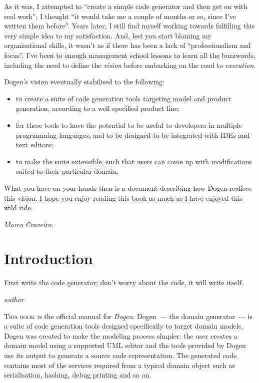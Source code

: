 \documentclass{book}
\begin{document}
As it was, I attempted to ``create a simple code generator and then
get on with real work''; I thought ``it would take me a couple of
months or so, since I've written them before''. Years later, I still
find myself working towards fulfilling this very simple idea to my
satisfaction. And, lest you start blaming my organisational skills, it
wasn't as if there has been a lack of ``professionalism and
focus''. I've been to enough management school lessons to learn all
the buzzwords, including the need to define the \emph{vision} before
embarking on the road to \emph{execution}.

Dogen's vision eventually stabilised to the following:

\begin{itemize}
\item to create a suite of code generation tools targeting model and
  product generation, according to a well-specified product line;
\item for these tools to have the potential to be useful to developers
  in multiple programming languages, and to be designed to be
  integrated with IDEs and text editors;
\item to make the suite extensible, such that users can come up with
  modifications suited to their particular domain.
\end{itemize}

What you have on your hands then is a document describing how Dogen
realises this vision. I hope you enjoy reading this book as much as I
have enjoyed this wild ride.

\begin{flushright}\emph{Marco Craveiro}, \the\year\end{flushright}

\chapter*{Introduction}

\epigraph{First write the code generator; don't worry about the code,
  it will write itself.}{\emph{author}}

\lettrine{T}{his book is} the official manual for
\emph{Dogen}. Dogen~--- the domain generator~--- is a suite of code
generation tools designed specifically to target domain models. Dogen
was created to make the modeling process simpler: the user creates a
domain model using a supported UML editor and the tools provided by
Dogen use its output to generate a source code representation. The
generated code contains most of the services required from a typical
domain object such as serialisation, hashing, debug printing and so
on.
\end{document}
